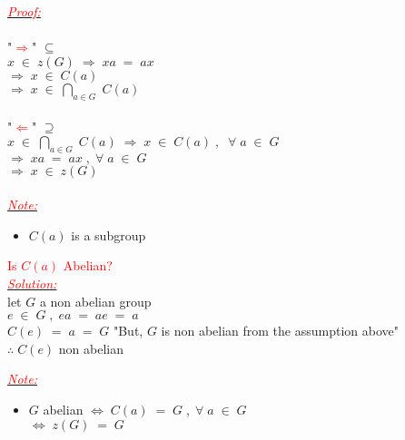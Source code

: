 \documentclass{report}
\newcounter{testexample}
\begin{document}
\emph{\underline{\textcolor{red}{Proof:}}}\\
\vspace{0.03cm}\\
"\textcolor{red}{$\Longrightarrow$}" \; \; $\subseteq$\\
$x \; \in \; z(G) \; \Longrightarrow \; xa \; = \; ax$\\
\hspace*{1.6cm} $\Longrightarrow \; x \; \in \; C(a)$\\
\hspace*{1.6cm} $\Longrightarrow \; x \; \in \; \bigcap_{a \in G} \; C(a)$\\
\vspace{0.1cm}\\
"\textcolor{red}{$\Longleftarrow$}" \; \; $\supseteq$\\
$x \; \in \; \bigcap_{a \in G} \; C(a) \; \Longrightarrow \; x \; \in \; C(a) \; , \; \; \forall \; a \; \in \; G$\\
\hspace*{2.6cm} $\Longrightarrow \; xa \; = \; ax \;, \; \forall \; a \; \in \; G$\\
\hspace*{2.6cm} $\Longrightarrow \; x \; \in \; z(G)$\\
\vspace{0.1cm}\\
\emph{\underline{\textcolor{red}{Note:}}}\\
\begin{itemize}
\item $C(a)$ is a subgroup
\end{itemize}
\begin{testexample}
\textcolor{red}{Is $C(a)$ Abelian?}\\
\emph{\underline{\textcolor{red}{Solution:}}}\\
let $G$ a non abelian group \\
$e \; \in \; G \; , \; ea \; = \; ae \;= \; a$\\
\hspace*{1.2cm} $C(e) \; = \; a \; = \; G$ \hfill "But, $G$ is non abelian from the assumption above"\\
$\therefore \; C(e)$ \; non abelian 
\end{testexample}
\vspace{0.1cm}

\emph{\underline{\textcolor{red}{Note:}}}\\
\begin{itemize}
\item $G$ abelian \; $\Longleftrightarrow \; C(a) \; = \; G \; , \; \forall \; a \; \in \; G$\\
\hspace*{1.7cm} $\Longleftrightarrow \; z(G) \; = \; G$
\end{itemize}
\vspace{0.2cm}
\end{document}
